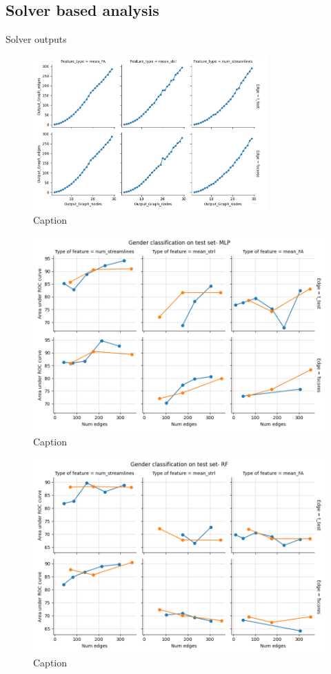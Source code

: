\documentclass[msthesis.tex]{subfiles}
\begin{document}
\subsection{Solver based analysis}
Solver outputs 
\begin{figure}
    \centering
    \includegraphics[width=0.8\textwidth]{images/Gender_nodes_preserved.png}
    \caption{Caption}
    \label{fig:my_label}
\end{figure}
\begin{figure}
    \centering
    \includegraphics[width = \textwidth]{images/Gender_classification_comparison_MLP.png}
    \caption{Caption}
    \label{fig:my_label}
\end{figure}
\begin{figure}
    \centering
    \includegraphics[width = \textwidth]{images/Gender_classification_comparison_RF.png}
    \caption{Caption}
    \label{fig:my_label}
\end{figure}
\end{document}
